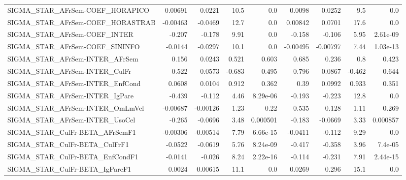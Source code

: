 \begin{tabular}{lrrrrrrrr}
SIGMA\_STAR\_AFrSem-COEF\_HORAPICO       &     0.00691 &       0.0221 &     10.5 &      0.0 &     0.0098 &      0.0252 &          9.5 &           0.0 \\
SIGMA\_STAR\_AFrSem-COEF\_HORASTRAB      &    -0.00463 &      -0.0469 &     12.7 &      0.0 &    0.00842 &      0.0701 &         17.6 &           0.0 \\
SIGMA\_STAR\_AFrSem-COEF\_INTER          &      -0.207 &       -0.178 &     9.91 &      0.0 &     -0.158 &      -0.106 &         5.95 &      2.61e-09 \\
SIGMA\_STAR\_AFrSem-COEF\_SININFO        &     -0.0144 &      -0.0297 &     10.1 &      0.0 &   -0.00495 &    -0.00797 &         7.44 &      1.03e-13 \\
SIGMA\_STAR\_AFrSem-INTER\_AFrSem        &       0.156 &       0.0243 &    0.521 &    0.603 &      0.685 &       0.236 &          0.8 &         0.423 \\
SIGMA\_STAR\_AFrSem-INTER\_CulFr         &       0.522 &       0.0573 &   -0.683 &    0.495 &      0.796 &      0.0867 &       -0.462 &         0.644 \\
SIGMA\_STAR\_AFrSem-INTER\_EnfCond       &      0.0608 &       0.0104 &    0.912 &    0.362 &       0.39 &      0.0992 &        0.933 &         0.351 \\
SIGMA\_STAR\_AFrSem-INTER\_IgPare        &      -0.439 &       -0.112 &     4.46 & 8.29e-06 &     -0.193 &      -0.223 &         12.8 &           0.0 \\
SIGMA\_STAR\_AFrSem-INTER\_OmLmVel       &    -0.00687 &     -0.00126 &     1.23 &     0.22 &      0.535 &       0.128 &         1.11 &         0.269 \\
SIGMA\_STAR\_AFrSem-INTER\_UsoCel        &      -0.265 &      -0.0696 &     3.48 & 0.000501 &     -0.183 &     -0.0669 &         3.33 &      0.000857 \\
SIGMA\_STAR\_CulFr-BETA\_AFrSemF1        &    -0.00306 &     -0.00514 &     7.79 & 6.66e-15 &    -0.0411 &      -0.112 &         9.29 &           0.0 \\
SIGMA\_STAR\_CulFr-BETA\_CulFrF1         &     -0.0522 &      -0.0619 &     5.76 & 8.24e-09 &     -0.417 &      -0.358 &         3.96 &       7.4e-05 \\
SIGMA\_STAR\_CulFr-BETA\_EnfCondF1       &     -0.0141 &       -0.026 &     8.24 & 2.22e-16 &     -0.114 &      -0.231 &         7.91 &      2.44e-15 \\
SIGMA\_STAR\_CulFr-BETA\_IgPareF1        &      0.0024 &      0.00615 &     11.1 &      0.0 &     0.0269 &       0.296 &         15.1 &           0.0 \\

\end{tabular}
